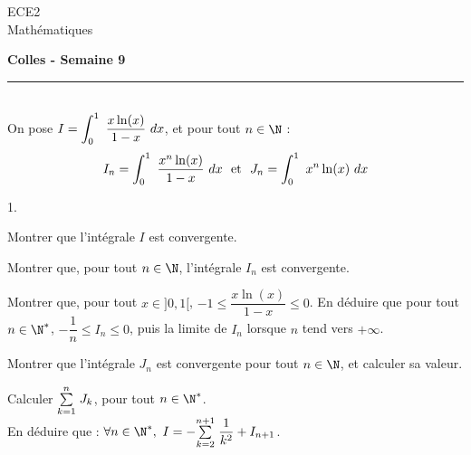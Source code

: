 \documentclass[11pt]{article}%
\begin{document}
\begin{flushleft}
ECE2 \\
Mathématiques
\end{flushleft}

\begin{center}
\textbf{\Large{Colles - Semaine 9}}
\end{center}

\hrule

\vspace*{0,2cm}

\begin{exercice}~\\
On pose $ I=\displaystyle \int_{0}^{1}\  \dfrac{x\ln(x)}{1-x}\ dx$, et pour tout $n\in\N$ 
:
\[
 I_n=\dint{0}{1} \frac{x^n \ln(x)}{1-x}\dx \ \mbox{ et } \ 
 J_n=\dint{0}{1} x^n \ln(x)\dx
\]
\begin{noliste}{1.}
  \item Montrer que l'intégrale $I$ est convergente.
  \item Montrer que, pour tout $n\in\N$, l'intégrale $I_n$ est 
  convergente.
  \item Montrer que, pour tout $x\in]0,1[$, $-1\leq 
  \dfrac{x\ln(x)}{1-x}\leq 0$. En déduire que pour tout $n\in\N^*$, 
  $-\dfrac{1}{n}\leq I_n \leq 0$, puis la limite de $I_n$ lorsque $n$ 
  tend vers $+\infty$.
  \item Montrer que l'intégrale $J_n$ est convergente pour tout 
  $n\in\N$, et calculer sa valeur.
  \item Calculer $ {\textstyle\sum\limits_{k=1}^{n}}\hspace{.1cm} J_k$, pour tout $n\in\N^*$.\\
  En déduire que : $\forall n\in\N^*, \ I=-\Sum{k=2}{n+1} 
  \dfrac{1}{k^2} +I_{n+1}$.
\end{noliste}
\end{exercice}
\end{document}
